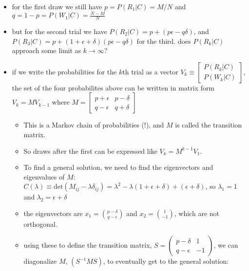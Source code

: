 \documentclass[../jaynes_prob_theory_notes.tex]{subfiles}
\begin{document}
\begin{itemize}
\begin{itemize}
                    \begin{itemize}
                        \item for the first draw we still have $p = P(R_1|C) = M/N$ and $q = 1 - p = P(W_1|C) = \frac{N-M}{N}$
                        \item but for the second trial we have $P(R_2|C) = p + (p\epsilon - q\delta)$, and $P(R_3|C) = p + (1+\epsilon + \delta)(p\epsilon - q\delta)$ for the third. does $P(R_k|C)$ approach some limit as $k \rightarrow \infty$?
                        \item if we write the probabilities for the $k$th trial as a vector $V_k \equiv \left[\begin{smallmatrix} P(R_k|C) \\ P(W_k|C) \end{smallmatrix}\right]$, the set of the four probabilites above can be written in matrix form $V_k = MV_{k-1}$ where $M = \left[ \begin{smallmatrix} p+\epsilon & p-\delta \\ q-\epsilon & q+\delta \end{smallmatrix} \right]$
                            \begin{itemize}
                                \item This is a Markov chain of probabilities (!), and $M$ is called the transition matrix. 
                                \item So draws after the first can be expressed like $V_k = M^{k-1}V_1$. 
                                \item To find a general solution, we need to find the eigenvectors and eigenvalues of $M$: $C(\lambda) \equiv \mathrm{det}(M_{ij} - \lambda\delta_{ij}) = \lambda^2 - \lambda(1+\epsilon+\delta)+(\epsilon+\delta)$, so $\lambda_1=1$ and $\lambda_2 = \epsilon + \delta$
                                \item the eigenvectors are $x_1 = \binom{p-\delta}{q-\epsilon}$ and $x_2 = \binom{1}{-1}$, which are not orthogonal.
                                \item using these to define the transition matrix, $S = \left( \begin{smallmatrix} p-\delta & 1 \\ q-\epsilon & -1 \end{smallmatrix} \right)$, we can diagonalize $M$, $(S^{-1} M S)$, to eventually get to the general solution: 
                                    \begin{equation*}

\end{equation*}
\end{itemize}
\end{itemize}
\end{itemize}
\end{itemize}
\end{document}
